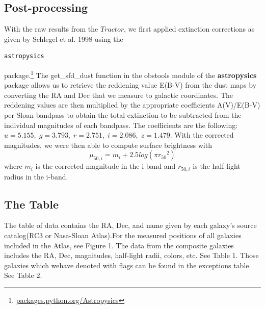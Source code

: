 \documentclass[12pt,preprint,pdftex]{aastex}
\begin{document}
\subsection{Post-processing}
With the raw results from the $Tractor$, we first applied extinction
corrections as given by Schlegel et al. 1998 using the
\begin{verbatim}astropysics\end{verbatim}
package.\footnote{\url{packages.python.org/Astropysics}} The
 get\_sfd\_dust function in the obstools module of the {\bf
 astropysics} package allows us to retrieve the reddening value E(B-V)
 from the dust maps by converting the RA and Dec that we measure to
 galactic coordinates. The reddening values are then multiplied by the
 appropriate coefficients A(V)/E(B-V) per Sloan bandpass to obtain the
 total extinction to be subtracted from the individual magnitudes of
 each bandpass. The coefficients are the following:
 $u=5.155,\;g=3.793,\; r=2.751,\; i=2.086,\; z=1.479$. With the
 corrected magnitudes, we were then able to compute surface brightness
 with \begin{equation}
 \mu_{50,i}=m_i+2.5log(\pi{r_{50}}^2) \end{equation} where $m_i$ is
 the corrected magnitude in the i-band and $r_{50,i}$ is the
 half-light radius in the i-band.

\subsection{The Table}
The table of data contains the RA, Dec, and name given by each
galaxy's source catalog(RC3 or Nasa-Sloan Atlas).For the measured
positions of all galaxies included in the Atlas, see Figure 1. The
data from the composite galaxies includes the RA, Dec, magnitudes,
half-light radii, colors, etc. See Table 1. Those galaxies which
wehave denoted with flags can be found in the exceptions table. See
Table 2.

\end{document}
